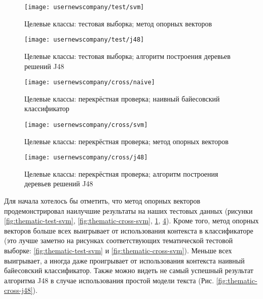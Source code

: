 \begin{figure}[h!]
  \centering
    \texttt{[image: usernewscompany/test/svm]}
    \caption{Целевые классы: тестовая выборка; метод опорных векторов}
    \label{fig:usernewscompany-test-svm}
\end{figure}

\begin{figure}[h!]
  \centering
    \texttt{[image: usernewscompany/test/j48]}
    \caption{Целевые классы: тестовая выборка; алгоритм построения деревьев решений J48}
    \label{fig:usernewscompany-test-j48}
\end{figure}

\begin{figure}[h!]
  \centering
    \texttt{[image: usernewscompany/cross/naive]}
    \caption{Целевые классы: перекрёстная проверка; наивный байесовский классификатор}
    \label{fig:usernewscompany-cross-naive}
\end{figure}

\begin{figure}[h!]
  \centering
    \texttt{[image: usernewscompany/cross/svm]}
    \caption{Целевые классы: перекрёстная проверка; метод опорных векторов}
    \label{fig:usernewscompany-cross-svm}
\end{figure}

\begin{figure}[h!]
  \centering
    \texttt{[image: usernewscompany/cross/j48]}
    \caption{Целевые классы: перекрёстная проверка; алгоритм построения деревьев решений J48}
    \label{fig:usernewscompany-cross-j48}
\end{figure}

Для начала хотелось бы отметить, что метод опорных векторов продемонстрировал наилучшие результаты на наших тестовых данных (рисунки  \ref{fig:thematic-test-svm}, \ref{fig:thematic-cross-svm}, \ref{fig:usernewscompany-test-svm}, \ref{fig:usernewscompany-cross-svm}). Кроме того, метод опорных векторов больше всех выигрывает от использования контекста в классификаторе (это лучше заметно на рисунках соответствующих тематической тестовой выборке: \ref{fig:thematic-test-svm} и \ref{fig:thematic-cross-svm}). Меньше всех выигрывает, а иногда даже проигрывает от использования контекста наивный байесовский классификатор. Также можно видеть не самый успешный результат алгоритма J48 в случае использования простой модели текста (Рис. \ref{fig:thematic-cross-j48}).


